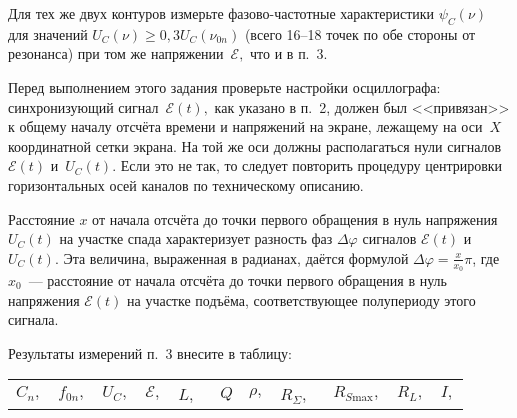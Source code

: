 \begin{lab:task}
    \item Для тех же двух контуров измерьте фазово-частотные характеристики
$\psi_C(\nu)$ для значений $U_C(\nu)\ge0,3U_C(\nu_{0n})$ (всего 16--18 точек по
обе стороны от резонанса) при том же напряжении~$\mathcal{E},$ что и в п.~3.

Перед выполнением этого задания проверьте настройки осциллографа:
синхронизующий сигнал~$\mathcal{E}(t),$ как указано в п.~2, должен был
<<привязан>> к общему началу отсчёта времени и напряжений на экране, лежащему на
оси~$X$ координатной сетки экрана. На той же оси должны располагаться нули
сигналов~$\mathcal{E}(t)$ и~$U_C(t)$. Если это не так, то следует повторить
процедуру центрировки горизонтальных осей каналов по техническому описанию.

Расстояние $x$ от начала отсчёта до точки первого обращения в нуль
напряжения $U_C(t)$ на участке спада характеризует разность фаз $\Delta\varphi$
сигналов $\mathcal{E}(t)$ и $U_C(t)$. Эта величина, выраженная в радианах,
даётся формулой $\Delta\varphi=\frac{x}{x_0}\pi$, где $x_0$~--- расстояние
от начала отсчёта до точки первого обращения в нуль напряжения $\mathcal{E}(t)$
на участке подъёма, соответствующее полупериоду этого сигнала.



		    \item Результаты измерений п.~3 внесите в таблицу:\par
\noindent\small\begin{tabular}{|c|c|c|c|c|c|c|c|c|c|c|} 
		                    \hline
		                    $C_n,$ & $f_{0n},$& $U_C,$& $\mathcal{E},$ & $L,$~&
$Q$& $\rho,$ & $R_{\Sigma},$~& $R_{S\text{max}},$& $R_L,$& $I,$\\


\end{tabular}
\end{lab:task}
